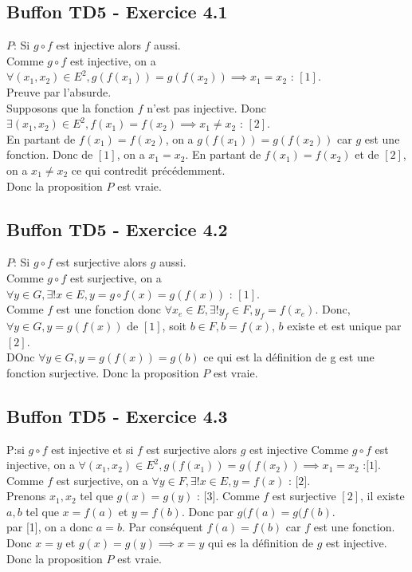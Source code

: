 \documentclass[]{book}
\theoremstyle{definition}
\begin{document}
\subsection*{Buffon TD5 - Exercice 4.1}
$P$: Si $g \circ f$ est injective alors $f$ aussi.\\
Comme $g \circ f$ est injective, on a $\forall (x_1, x_2) \in E^2, g(f(x_1)) = g(f(x_2)) \implies x_1 = x_2 \textrm{  : } [1]$.\\
Preuve par l'absurde.\\
Supposons que la fonction $f$ n'est pas injective. Donc $\exists (x_1, x_2) \in E^2, f(x_1)=f(x_2) \implies x_1 \neq x_2 \textrm{  : } [2]$.\\
En partant de $f(x_1)=f(x_2)$, on a $g(f(x_1))=g(f(x_2))$ car $g$ est une fonction. Donc de $[1]$, on a $x_1 = x_2$.
En partant de $f(x_1)=f(x_2)$ et de $[2]$, on a $x_1 \neq x_2$ ce qui contredit pr\'ec\'edemment.\\
Donc la proposition $P$ est vraie.

\subsection*{Buffon TD5 - Exercice 4.2}
$P$: Si $g \circ f$ est surjective alors $g$ aussi.\\
Comme $g \circ f$ est surjective, on a $\forall y \in G, \exists !x \in E, y = g \circ f(x) = g(f(x)) \textrm{  : } [1]$.\\
Comme $f$ est une fonction donc $\forall x_e \in E, \exists !y_f \in F, y_f = f(x_e)$.
Donc, $\forall y \in G, y=g(f(x))$ de $[1]$, soit $b \in F, b = f(x)$, $b$ existe et est unique par $[2]$. \\
DOnc $ \forall y \in G, y=g(f(x))=g(b)$ ce qui est la d\'efinition de g est une fonction surjective.
Donc la proposition $P$ est vraie.

\subsection*{Buffon TD5 - Exercice 4.3}
P:si $g \circ f$ est injective et si $f$ est surjective alors $g$ est injective
Comme $g \circ f$ est injective, on a $\forall (x_1, x_2) \in E^2, g(f(x_1)) = g(f(x_2)) \implies x_1 = x_2 \textrm{  :[1]}$.\\
Comme $f$ est surjective, on a $\forall y \in F, \exists !x \in E, y = f(x) \textrm{  : [2]}$.\\

Prenons $x_1, x_2$ tel que $g(x) = g(y) \textrm{  : [3]}$. Comme $f$ est surjective $[2]$, il existe $a,b$ tel que $x=f(a)$ et $y=f(b)$. Donc par $g(f(a) = g(f(b)$.\\
par [1], on a donc $a=b$. Par cons\'equent $f(a) = f(b)$ car $f$ est une fonction. Donc $x=y$ et $g(x) = g(y) \implies x = y$ qui es la d\'efinition de $g$ est injective.\\
Donc la proposition $P$ est vraie.
\end{document}
